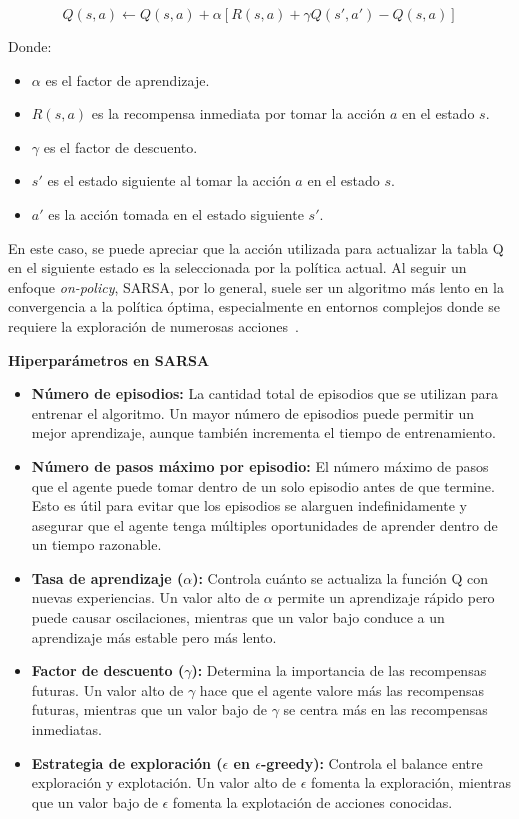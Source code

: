 \documentclass[conference,a4paper]{IEEEtran}
\begin{document}
\[
Q(s, a) \leftarrow Q(s, a) + \alpha [R(s, a) + \gamma Q(s', a') - Q(s, a)]
\]

Donde:
\begin{itemize}
    \item \(\alpha\) es el factor de aprendizaje.
    \item \(R(s, a)\) es la recompensa inmediata por tomar la acción \(a\) en el estado \(s\).
    \item \(\gamma\) es el factor de descuento.
    \item \(s'\) es el estado siguiente al tomar la acción \(a\) en el estado \(s\).
    \item \(a'\) es la acción tomada en el estado siguiente \(s'\).\newline
\end{itemize}

En este caso, se puede apreciar que la acción utilizada para actualizar la tabla Q en el siguiente estado es la seleccionada por la política actual. Al seguir un enfoque \textit{on-policy}, SARSA, por lo general, suele ser un algoritmo más lento en la convergencia a la política óptima, especialmente en entornos complejos donde se requiere la 
exploración de numerosas acciones~\cite{b4}.\newline

\textbf{Hiperparámetros en SARSA}
\begin{itemize}
  \item \textbf{Número de episodios:} La cantidad total de episodios que se utilizan para entrenar el algoritmo. Un mayor número de episodios puede permitir un mejor aprendizaje, aunque también incrementa el tiempo de entrenamiento.
  \item \textbf{Número de pasos máximo por episodio:} El número máximo de pasos que el agente puede tomar dentro de un solo episodio antes de que termine. Esto es útil para evitar que los episodios se alarguen indefinidamente y asegurar que el agente tenga múltiples oportunidades de aprender dentro de un tiempo razonable.
  \item \textbf{Tasa de aprendizaje (\(\alpha\)):} Controla cuánto se actualiza la función Q con nuevas experiencias. Un valor alto de \(\alpha\) permite un aprendizaje rápido pero puede causar oscilaciones, mientras que un valor bajo conduce a un aprendizaje más estable pero más lento.
  \item \textbf{Factor de descuento (\(\gamma\)):} Determina la importancia de las recompensas futuras. Un valor alto de \(\gamma\) hace que el agente valore más las recompensas futuras, mientras que un valor bajo de \(\gamma\) se centra más en las recompensas inmediatas.
  \item \textbf{Estrategia de exploración (\(\epsilon\) en \(\epsilon\)-greedy):} Controla el balance entre exploración y explotación. Un valor alto de \(\epsilon\) fomenta la exploración, mientras que un valor bajo de \(\epsilon\) fomenta la explotación de acciones conocidas.\newline
\end{itemize}
\end{document}
